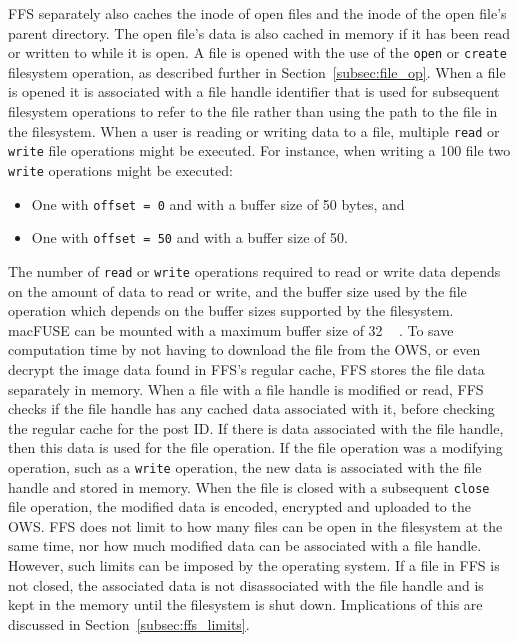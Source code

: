 \gls{FFS} separately also caches the inode of open files and the inode of the open file's parent directory. The open file's data is also cached in memory if it has been read or written to while it is open. A file is opened with the use of the \texttt{open} or \texttt{create} filesystem operation, as described further in Section~\ref{subsec:file_op}. When a file is opened it is associated with a file handle identifier that is used for subsequent filesystem operations to refer to the file rather than using the path to the file in the filesystem. When a user is reading or writing data to a file, multiple \texttt{read} or \texttt{write} file operations might be executed. For instance, when writing a \SI{100}{\byte} file two \texttt{write} operations might be executed:
\begin{itemize}
	\item One with \texttt{offset = 0} and with a buffer size of \SI{50}{\byte} bytes, and
	\item One with \texttt{offset = 50} and with a buffer size of \SI{50}{\byte}.
\end{itemize}
The number of \texttt{read} or \texttt{write} operations required to read or write data depends on the amount of data to read or write, and the buffer size used by the file operation which depends on the buffer sizes supported by the filesystem. macFUSE can be mounted with a maximum buffer size of \SI{32}{\mega\byte}\,\cite{fleischerMountOptionsOsxfuse2020}. To save computation time by not having to download the file from the \gls{OWS}, or even decrypt the image data found in \gls{FFS}'s regular cache, \gls{FFS} stores the file data separately in memory. When a file with a file handle is modified or read, \gls{FFS} checks if the file handle has any cached data associated with it, before checking the regular cache for the post ID. If there is data associated with the file handle, then this data is used for the file operation. If the file operation was a modifying operation, such as a \texttt{write} operation, the new data is associated with the file handle and stored in memory. When the file is closed with a subsequent \texttt{close} file operation, the modified data is encoded, encrypted and uploaded to the \gls{OWS}. \gls{FFS} does not limit to how many files can be open in the filesystem at the same time, nor how much modified data can be associated with a file handle. However, such limits can be imposed by the operating system. If a file in \gls{FFS} is not closed, the associated data is not disassociated with the file handle and is kept in the memory until the filesystem is shut down. Implications of this are discussed in Section~\ref{subsec:ffs_limits}.

